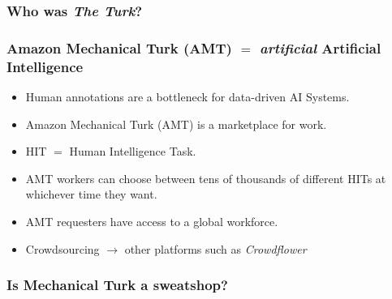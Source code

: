 \documentclass[10pt]{beamer}
\newenvironment{itemwide}%
{\begin{itemize}%
    \setlength{\itemsep}{5pt}%
    \setlength{\parskip}{5pt}}%
  {\end{itemize}}
\begin{document}
\begin{frame}
  \frametitle{Who was \textit{The Turk}?}
  \begin{center}
  \end{center}
\end{frame}

\begin{frame}
  \frametitle{Amazon Mechanical Turk (AMT) $=$ \textit{artificial} Artificial Intelligence}
	\begin{itemwide}
 	\item Human annotations are a bottleneck for data-driven AI Systems.
	\item Amazon Mechanical Turk (AMT) is a marketplace for work.
	\item HIT $=$ Human Intelligence Task.
	\item AMT workers can choose between tens of thousands of different HITs at whichever time they want.
	\item AMT requesters have access to a global workforce.
	\item Crowdsourcing $\rightarrow$ other platforms such as \textit{Crowdflower}
	\end{itemwide}
\end{frame}

\begin{frame}
  \frametitle{Is Mechanical Turk a sweatshop?}
  \begin{center}
  \end{center}
\end{frame}
\end{document}

